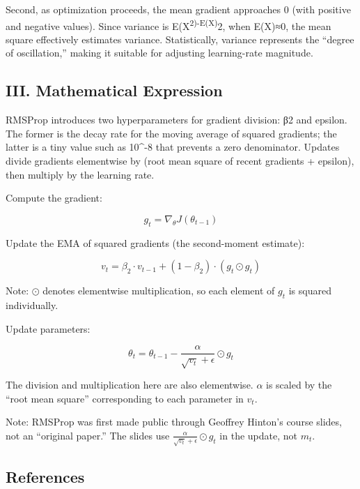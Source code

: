 Second, as optimization proceeds, the mean gradient approaches 0 (with positive and negative values). Since variance is E(X\textsuperscript{2)-E(X)}2, when E(X)≈0, the mean square effectively estimates variance. Statistically, variance represents the ``degree of oscillation,'' making it suitable for adjusting learning-rate magnitude.

\hypertarget{iii.-mathematical-expression-1}{%
\subsection{III. Mathematical Expression}\label{iii.-mathematical-expression-1}}

RMSProp introduces two hyperparameters for gradient division: β2 and epsilon. The former is the decay rate for the moving average of squared gradients; the latter is a tiny value such as 10\^{}-8 that prevents a zero denominator. Updates divide gradients elementwise by (root mean square of recent gradients + epsilon), then multiply by the learning rate.

Compute the gradient:

\[
g_t = \nabla_\theta J(\theta_{t-1})
\]

Update the EMA of squared gradients (the second-moment estimate):

\[
v_t = \beta_2 \cdot v_{t-1} + (1-\beta_2)\cdot (g_t \odot g_t)
\]

Note: \(\odot\) denotes elementwise multiplication, so each element of \(g_t\) is squared individually.

Update parameters:

\[
\theta_t = \theta_{t-1} - \frac{\alpha}{\sqrt{v_t}+\epsilon}\odot g_t
\]

The division and multiplication here are also elementwise. \(\alpha\) is scaled by the ``root mean square'' corresponding to each parameter in \(v_t\).

Note: RMSProp was first made public through Geoffrey Hinton's course slides, not an ``original paper.'' The slides use \(\frac{\alpha}{\sqrt{v_t}+\epsilon}\odot g_t\) in the update, not \(m_t\).

\FloatBarrier
{}
\hypertarget{references-27}{%
\subsection{References}\label{references-27}}

